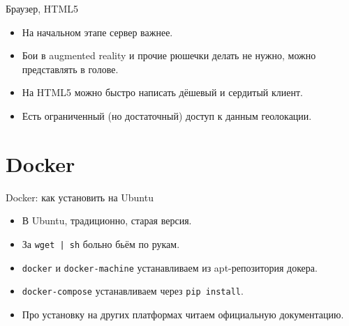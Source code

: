 \documentclass[aspectratio=169,handout,bigger]{beamer}
\begin{document}

\begin{frame}{Браузер, HTML5}
  \begin{itemize}
    \item На начальном этапе сервер важнее.
    \item Бои в augmented reality и прочие рюшечки делать не нужно,
          можно представлять в голове.
    \item На HTML5 можно быстро написать дёшевый и сердитый клиент.
    \item Есть ограниченный (но достаточный) доступ к данным геолокации.
  \end{itemize}
\end{frame}


\section{Docker}


\begin{frame}{Docker: как установить на Ubuntu}
  \begin{itemize}
    \item В Ubuntu, традиционно, старая версия.
    \item За \texttt{wget | sh} больно бьём по рукам.
    \item \texttt{docker} и \texttt{docker-machine}
          устанавливаем из apt-репозитория докера.
    \item \texttt{docker-compose} устанавливаем через \texttt{pip install}.
    \item Про установку на других платформах читаем официальную документацию.
  \end{itemize}
\end{frame}

\end{document}
